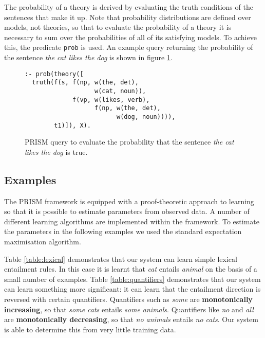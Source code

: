 \documentclass{svmult}
\begin{document}
The probability of a theory is derived by evaluating the truth conditions of the sentences that make it up. Note that probability distributions are defined over models, not theories, so that  to evaluate the
probability of a theory it is necessary to sum over the probabilities of all of its satisfying models. To achieve this,  the predicate \texttt{prob} is used. An
example query returning the probability of the sentence {\em the cat likes the dog\/} is shown in figure \ref{figure:query}. 




\begin{figure}
\begin{lstlisting}
:- prob(theory([
  truth(f(s, f(np, w(the, det),
                   w(cat, noun)),
             f(vp, w(likes, verb),
                   f(np, w(the, det),
                         w(dog, noun)))),
        t1)]), X).
\end{lstlisting}
\caption{PRISM query to evaluate the probability that the sentence
  \emph{the cat likes the dog} is true.}
\label{figure:query}
\end{figure}

\subsection{Examples}


The PRISM framework is equipped with a proof-theoretic approach to learning so that it is possible to estimate parameters from observed data. A number of different learning algorithms are implemented within the framework. To estimate the
parameters in the following examples we used the standard expectation maximisation algorithm.

Table \ref{table:lexical} demonstrates that our system can learn
simple lexical entailment rules. In this case it is learnt that \emph{cat} entails
\emph{animal} on the basis of a small number of examples. Table \ref{table:quantifiers} demonstrates that our system can learn
something more significant: it can learn that the entailment direction
is reversed with certain quantifiers. Quantifiers such as \emph{some} are
\textbf{monotonically increasing}, so that \emph{some cats} entails
\emph{some animals}. Quantifiers like \emph{no} and \emph{all} are
\textbf{monotonically decreasing}, so that \emph{no animals} entails
\emph{no cats}. Our system is able to determine this from very little
training data.
\end{document}
